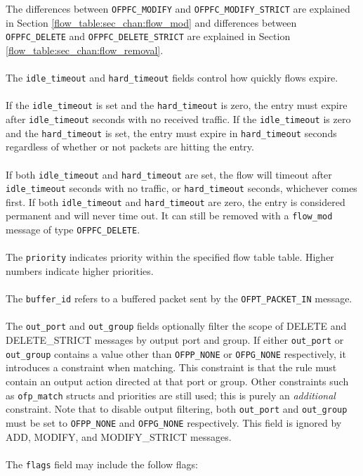 
The differences between \verb|OFPFC_MODIFY| and \verb|OFPFC_MODIFY_STRICT| are explained in Section \ref{flow_table:sec_chan:flow_mod} and differences between \verb|OFPFC_DELETE| and \verb|OFPFC_DELETE_STRICT| are explained in Section \ref{flow_table:sec_chan:flow_removal}. 
\\\\
The \verb|idle_timeout| and \verb|hard_timeout| fields control how quickly flows expire.  
\\\\
If the \verb|idle_timeout| is set and the \verb|hard_timeout| is zero, the entry must expire after \verb|idle_timeout| seconds with no received traffic.  If the \verb|idle_timeout| is zero and the \verb|hard_timeout| is set, the entry must expire in \verb|hard_timeout| seconds regardless of whether or not packets are hitting the entry.
\\\\
If both \verb|idle_timeout| and \verb|hard_timeout| are set, the flow will timeout after \verb|idle_timeout| seconds with no traffic, or \verb|hard_timeout| seconds, whichever comes first.  If both \verb|idle_timeout| and \verb|hard_timeout| are zero, the entry is considered permanent and will never time out.  It can still be removed with a \verb|flow_mod| message of type \verb|OFPFC_DELETE|. 
\\\\
The \verb|priority| indicates priority within the specified flow table table. Higher numbers indicate higher priorities.
\\\\
The \verb|buffer_id| refers to a buffered packet sent by the \verb|OFPT_PACKET_IN| message.
\\\\
The \verb|out_port| and \verb|out_group| fields optionally filter the scope of DELETE and DELETE\_STRICT messages by output port and group.  If either \verb|out_port| or \verb|out_group| contains a value other than \verb|OFPP_NONE| or \verb|OFPG_NONE| respectively, it introduces a constraint when matching.  This constraint is that the rule must contain an output action directed at that port or group.  Other constraints such as \verb|ofp_match| structs and priorities are still used; this is purely an \emph{additional} constraint.  Note that to disable output filtering, both \verb|out_port| and \verb|out_group| must be set to \verb|OFPP_NONE| and \verb|OFPG_NONE| respectively.  This field is ignored by ADD, MODIFY, and MODIFY\_STRICT messages.
\\\\
The \verb|flags| field may include the follow flags:

